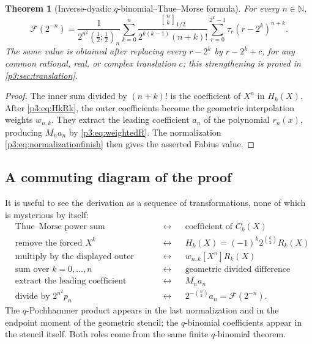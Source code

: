 \documentclass[11pt,oneside]{article}
\newtheorem{theorem}{Theorem}[section]
\theoremstyle{definition}
\theoremstyle{remark}
\newcommand{\qpoch}[3]{\left(#1;#2\right)_{#3}}
\newcommand{\halfqbinom}[2]{{\genfrac{[}{]}{0pt}{}{#1}{#2}}_{1/2}}
\newcommand{\F}{\mathcal F}
\newcommand{\coeff}[2]{\left[#1^{#2}\right]}
\newcommand{\N}{\mathbb N}
\newcommand{\tm}{\tau}
\begin{document}
\begin{theorem}[Inverse-dyadic $q$-binomial--Thue--Morse formula]
\label{p3:thm:inverseqformula}
For every $n\in\N$,
\begin{equation}\label{p3:eq:inverseqformula}
 \boxed{
 \F(2^{-n})=
 \frac{1}{2^{n^2}\qpoch{\frac12}{\frac12}{n}}
 \sum_{k=0}^{n}
 \frac{\halfqbinom{n}{k}}
      {2^{k(k-1)}(n+k)!}
 \sum_{r=0}^{2^k-1}
 \tm_r(r-2^k)^{n+k}.}
\end{equation}
The same value is obtained after replacing every $r-2^k$ by
$r-2^k+c$, for any common rational, real, or complex translation $c$;
this strengthening is proved in \cref{p3:sec:translation}.
\end{theorem}

\begin{proof}
The inner sum divided by $(n+k)!$ is the coefficient of $X^n$ in
$H_k(X)$.  After \eqref{p3:eq:HkRk}, the outer coefficients become the
geometric interpolation weights $w_{n,k}$.  They extract the leading
coefficient $a_n$ of the polynomial $r_n(x)$, producing $M_na_n$ by
\eqref{p3:eq:weightedR}.  The normalization \eqref{p3:eq:normalizationfinish}
then gives the asserted Fabius value.
\end{proof}

\subsection{A commuting diagram of the proof}

It is useful to see the derivation as a sequence of transformations, none of
which is mysterious by itself:
\begin{equation}\label{p3:eq:proofdiagram}
\begin{aligned}
&\text{Thue--Morse power sum}
&&\longleftrightarrow&&
\text{coefficient of }C_k(X)\\
&\text{remove the forced }X^k
&&\longleftrightarrow&&
H_k(X)=(-1)^k2^{\binom{k}{2}}R_k(X)\\
&\text{multiply by the displayed outer factor}
&&\longleftrightarrow&&
w_{n,k}\coeff{X}{n}R_k(X)\\
&\text{sum over }k=0,\ldots,n
&&\longleftrightarrow&&
\text{geometric divided difference}\\
&\text{extract the leading coefficient}
&&\longleftrightarrow&&
M_na_n\\
&\text{divide by }2^{n^2}p_n
&&\longleftrightarrow&&
2^{-\binom n2}a_n=\F(2^{-n}).
\end{aligned}
\end{equation}
The $q$-Pochhammer product appears in the last normalization and in the
endpoint moment of the geometric stencil; the $q$-binomial coefficients
appear in the stencil itself.  Both roles come from the same finite
$q$-binomial theorem.
\end{document}
